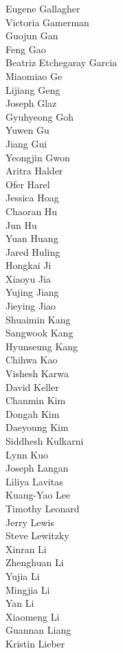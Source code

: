 Eugene Gallagher\\
Victoria Gamerman\\
Guojun  Gan\\
Feng Gao\\
Beatriz Etchegaray Garcia\\
Miaomiao Ge\\
Lijiang Geng\\
Joseph Glaz\\
Gyuhyeong Goh\\
Yuwen Gu\\
Jiang Gui\\
Yeongjin Gwon\\
Aritra Halder\\
Ofer Harel\\
Jessica Hoag\\
Chaoran Hu\\
Jun Hu\\
Yuan Huang\\
Jared Huling\\
Hongkai Ji\\
Xiaoyu Jia\\
Yujing Jiang\\
Jieying Jiao\\
Shuaimin Kang\\
Sangwook Kang\\
Hyunseung Kang\\
Chihwa Kao\\
Vishesh Karwa\\
David Keller\\
Chanmin Kim\\
Dongah Kim\\
Daeyoung Kim\\
Siddhesh Kulkarni\\
Lynn Kuo\\
Joseph Langan\\
Liliya Lavitas\\
Kuang-Yao Lee\\
Timothy Leonard\\
Jerry Lewis\\
Steve Lewitzky\\
Xinran Li\\
Zhenghuan Li\\
Yujia Li\\
Mingjia Li\\
Yan Li\\
Xiaomeng Li\\
Guannan Liang\\
Kristin Lieber\\
